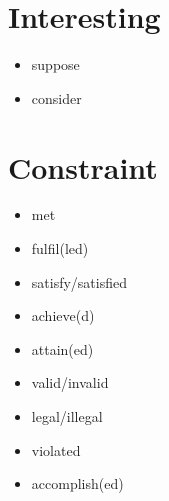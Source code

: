 \documentclass[twocolumn, a4paper]{article}
\begin{document}
\section{Interesting}
{\color{Rhodamine}
\begin{itemize}[leftmargin=*, noitemsep]
	\item suppose
	\item consider
\end{itemize}
}

\section{Constraint}
{\color{red}
	\begin{itemize}[leftmargin=*, noitemsep]
		\item met
		\item fulfil(led)
		\item satisfy/satisfied
		\item achieve(d)
		\item attain(ed)
		\item valid/invalid
		\item legal/illegal
		\item violated
		\item accomplish(ed)
	\end{itemize}
}





\begin{comment}
\begin{table}[h!]
	\centering
	\caption{EA comparisons}
	\begin{tabular}{cccccccccc}\toprule
		Constraint & Addition & Similar & Because & Emphasise & Contrast & Explain & Result & Time & Transition \\
		\midrule	
		met& & & & & & & & & \\
		fulfilled & & & & & & & & & \\
		& & & & & & & & & \\
		& & & & & & & & & \\
		& & & & & & & & & \\
		& & & & & & & & & \\
		& & & & & & & & & \\
		& & & & & & & & & \\
		& & & & & & & & & \\
		\bottomrule
	\end{tabular}	
	\label{table:words}
\end{table}

{\color{orange}
\begin{itemize}[leftmargin=*]
\item
\end{itemize}
}
\end{comment}








	
\end{document}
